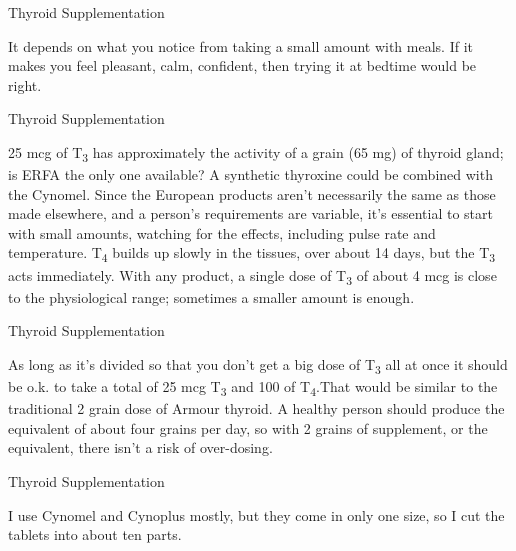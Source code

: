 \documentclass[11pt,oneside,openany,extrafontsizes]{memoir}
\begin{document}
\begin{standalonequote}{Thyroid Supplementation}

    \begin{answer}
        It depends on what you notice from taking a small amount with meals. If it makes you feel pleasant, calm, confident, then trying it at bedtime would be right.
    \end{answer}
\end{standalonequote}

\begin{standalonequote}{Thyroid Supplementation}

    \begin{answer}
        25 mcg of T\textsubscript{3} has approximately the activity of a grain (65 mg) of thyroid gland; is ERFA the only one available? A synthetic thyroxine could be combined with the Cynomel. Since the European products aren't necessarily the same as those made elsewhere, and a person's requirements are variable, it's essential to start with small amounts, watching for the effects, including pulse rate and temperature. T\textsubscript{4} builds up slowly in the tissues, over about 14 days, but the T\textsubscript{3} acts immediately. With any product, a single dose of T\textsubscript{3} of about 4 mcg is close to the physiological range; sometimes a smaller amount is enough.
    \end{answer}
\end{standalonequote}

\begin{standalonequote}{Thyroid Supplementation}

    \begin{answer}
        As long as it's divided so that you don't get a big dose of T\textsubscript{3} all at once it should be o.k. to take a total of 25 mcg T\textsubscript{3} and 100 of T\textsubscript{4}.That would be similar to the traditional 2 grain dose of Armour thyroid. A healthy person should produce the equivalent of about four grains per day, so with 2 grains of supplement, or the equivalent, there isn't a risk of over-dosing.
    \end{answer}
\end{standalonequote}

\begin{standalonequote}{Thyroid Supplementation}

    \begin{answer}
        I use Cynomel and Cynoplus mostly, but they come in only one size, so I cut the tablets into about ten parts.
    \end{answer}
\end{standalonequote}
\end{document}
